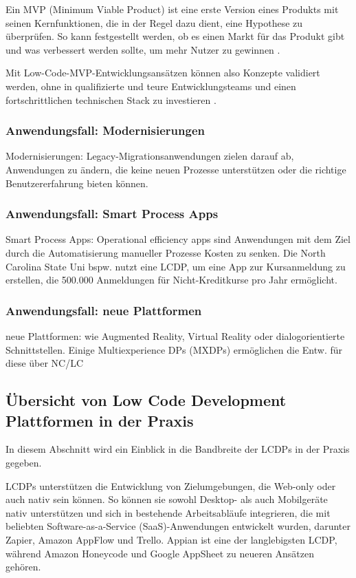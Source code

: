 \documentclass[12pt]{article} %
\begin{document}
	Ein MVP (Minimum Viable Product) ist eine erste Version eines Produkts mit seinen Kernfunktionen, die in der Regel dazu dient, eine Hypothese zu überprüfen. So kann festgestellt werden, ob es einen Markt für das Produkt gibt und was verbessert werden sollte, um mehr Nutzer zu gewinnen \cite{OleksiiGlib.2022}.
		
	Mit Low-Code-MVP-Entwicklungsansätzen können also Konzepte validiert werden, ohne in qualifizierte und teure Entwicklungsteams und einen fortschrittlichen technischen Stack zu investieren \cite{OleksiiGlib.2022}.
	
	\subsubsection{Anwendungsfall: Modernisierungen}
	Modernisierungen: Legacy-Migrationsanwendungen zielen darauf ab, Anwendungen zu ändern, die keine neuen Prozesse unterstützen oder die richtige Benutzererfahrung bieten können.
	
	\subsubsection{Anwendungsfall: Smart Process Apps}
	Smart Process Apps: Operational efficiency apps sind Anwendungen mit dem Ziel durch die Automatisierung manueller Prozesse Kosten zu senken. Die North Carolina State Uni bspw. nutzt eine LCDP, um eine App zur Kursanmeldung zu erstellen, die 500.000 Anmeldungen für Nicht-Kreditkurse pro Jahr ermöglicht.
	
	\subsubsection{Anwendungsfall: neue Plattformen}
	neue Plattformen: wie Augmented Reality, Virtual Reality oder dialogorientierte Schnittstellen. Einige Multiexperience DPs (MXDPs) ermöglichen die Entw. für diese über NC/LC 
	
	
	\subsection{Übersicht von Low Code Development Plattformen in der Praxis}	
	In diesem Abschnitt wird ein Einblick in die Bandbreite der LCDPs in der Praxis gegeben.
	
	LCDPs unterstützen die Entwicklung von Zielumgebungen, die Web-only oder auch nativ sein können. So können sie sowohl Desktop- als auch Mobilgeräte nativ unterstützen und sich in bestehende Arbeitsabläufe integrieren, die mit beliebten Software-as-a-Service (SaaS)-Anwendungen entwickelt wurden, darunter Zapier, Amazon AppFlow und Trello. Appian ist eine der langlebigsten LCDP, während Amazon Honeycode und Google AppSheet zu neueren Ansätzen gehören. \cite{DiRuscio.2022}
	
\end{document}

